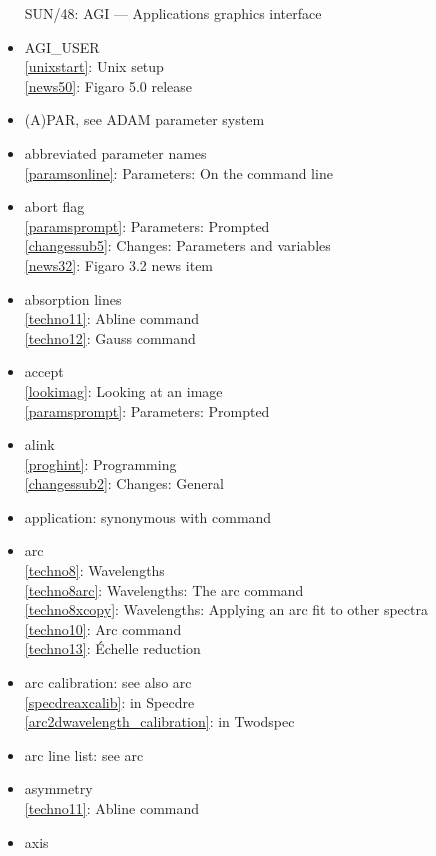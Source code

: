 \documentclass[11pt,twoside]{article}
\newcommand{\htmlref}[2]{#1}
\newcommand{\xref}[3]{#1}
\newcommand{\idxint}[2]{\ref{#1}: \htmlref{#2}{#1}}
\newcommand{\idxint}[2]{\htmlref{#2}{#1}}
\newcommand{\latorhtm}[2]{#1}
\newcommand{\latorhtm}[2]{#2}
\begin{document}
\begin{itemize}
   \xref{SUN/48: AGI \latorhtm{---}{-} Applications graphics interface}{sun48}{}
\item AGI\_USER\\
   \idxint{unixstart}{Unix setup}\\
   \idxint{news50}{Figaro 5.0 release}
\item (A)PAR, see ADAM parameter system
\item abbreviated parameter names\\
   \idxint{paramsonline}{Parameters: On the command line}
\item abort flag\\
   \idxint{paramsprompt}{Parameters: Prompted}\\
   \idxint{changessub5}{Changes: Parameters and variables}\\
   \idxint{news32}{Figaro 3.2 news item}
\item absorption lines\\
   \idxint{techno11}{Abline command}\\
   \idxint{techno12}{Gauss command}
\item accept\\
   \idxint{lookimag}{Looking at an image}\\
   \idxint{paramsprompt}{Parameters: Prompted}
\item alink\\
   \idxint{proghint}{Programming}\\
   \idxint{changessub2}{Changes: General}
\item application: synonymous with command
\item arc\\
   \idxint{techno8}{Wavelengths}\\
   \idxint{techno8arc}{Wavelengths: The arc command}\\
   \idxint{techno8xcopy}{Wavelengths: Applying an arc fit to other spectra}\\
   \idxint{techno10}{Arc command}\\
   \idxint{techno13}{\'Echelle reduction}
\item arc calibration: see also arc\\
   \idxint{specdreaxcalib}{in Specdre}\\
   \idxint{arc2dwavelength_calibration}{in Twodspec}
\item arc line list: see arc
\item asymmetry\\
   \idxint{techno11}{Abline command}
\item axis\\

\end{itemize}
\end{document}
